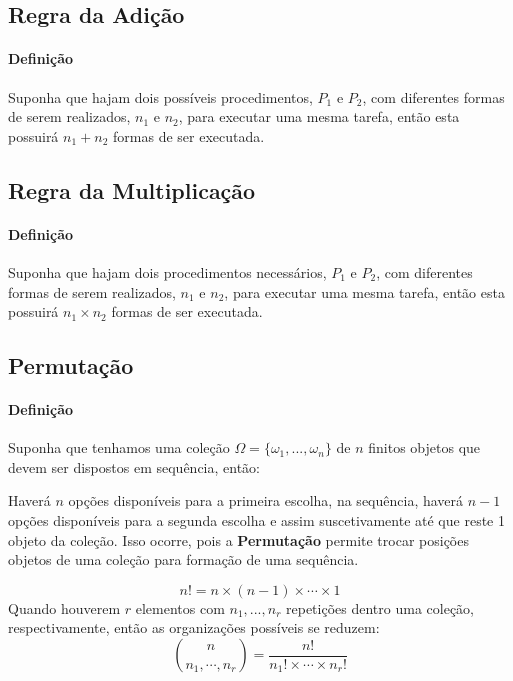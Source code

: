 \documentclass{article}
\begin{document}
        \subsection{Regra da Adição}
            \paragraph{Definição}Suponha que hajam dois possíveis procedimentos, $P_{1}$ e $P_{2}$, com diferentes formas de serem realizados, $n_{1}$ e $n_{2}$, para executar uma mesma tarefa, então esta possuirá $n_{1} + n_{2}$ formas de ser executada.

        \subsection{Regra da Multiplicação}
            \paragraph{Definição}Suponha que hajam dois procedimentos necessários, $P_{1}$ e $P_{2}$, com diferentes formas de serem realizados, $n_{1}$ e $n_{2}$, para executar uma mesma tarefa, então esta possuirá $n_{1} \times n_{2}$ formas de ser executada.

        \subsection{Permutação}
            \paragraph{Definição}Suponha que tenhamos uma coleção $\Omega = \{ \omega_{1}, ..., \omega_{n} \}$ de $n$ finitos objetos que devem ser dispostos em sequência, então:
                \begin{displayquote}[][]
                    Haverá $n$ opções disponíveis para a primeira escolha, na sequência, haverá $n-1$ opções disponíveis para a segunda escolha e assim suscetivamente até que reste 1 objeto da coleção. Isso ocorre, pois a \textbf{Permutação} permite trocar posições objetos de uma coleção para formação de uma sequência.
                \end{displayquote}
                \begin{equation}
                    \boxed{
                        n! = n \times (n - 1) \times \cdots \times 1
                    }
                \end{equation}
            Quando houverem $r$ elementos com $n_{1}, ..., n_{r}$ repetições dentro uma coleção, respectivamente, então as organizações possíveis se reduzem:
                \begin{equation}
                    \boxed{
                        \binom{n}{n_{1}, \cdots, n_{r}} = \frac{n!}{n_{1}! \times \cdots \times n_{r}!}
                    }
                \end{equation}
\end{document}
